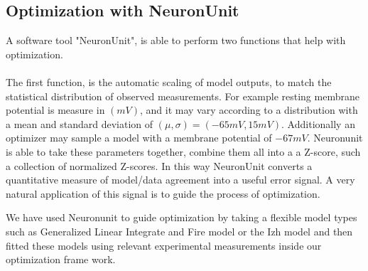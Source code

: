\subsection{Optimization with NeuronUnit}
A software tool "NeuronUnit", is able to perform two functions that help with optimization.\\
\\
The first function, is the automatic scaling of model outputs, to match the statistical distribution of observed measurements.%
%
For example resting membrane potential is measure in $(mV)$, and it may vary according to a distribution with a mean and standard deviation of $(\mu,\sigma)=(-65mV,15mV)$. Additionally an optimizer may sample a model with a membrane potential of $-67mV$. Neuronunit is able to take these parameters together, combine them all into a a Z-score, such a collection of normalized Z-scores. In this way NeuronUnit converts a quantitative measure of model/data agreement into a useful error signal. A very natural application of this signal is to guide the process of optimization.\newline 

We have used Neuronunit to guide optimization by taking a flexible model types such as Generalized Linear Integrate and Fire model\cite{teeter2018generalized} or the Izh model and then fitted these models using relevant experimental measurements inside our optimization frame work.

